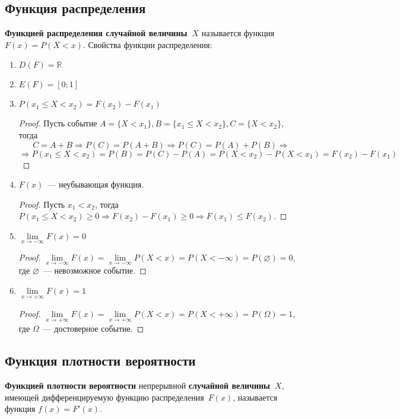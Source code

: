 \subsection{Функция распределения}
 \textbf{Функцией распределения случайной величины~$X$} называется функция $F(x) = P(X < x)$.
Свойства функции распределения:
\begin{enumerate}
	\item $D(F) = \mathbb R$
	
	\item $E(F) = [0; 1]$
	
	\item $P(x_1 \leqslant X < x_2) = F(x_2) - F(x_1)$
	\begin{proof}
	Пусть событие $A = \{ X < x_1 \}, B = \{ x_1 \leqslant X < x_2 \}, C = \{ X < x_2 \}$, тогда
	\begin{equation*}
	C = A + B \Rightarrow
	P(C) = P(A + B) \Rightarrow
	P(C) = P(A) + P(B) \Rightarrow
	\end{equation*}
	\begin{equation*}
	\Rightarrow P(x_1 \leqslant X < x_2) =
	P(B) =
	P(C) - P(A) =
	P(X < x_2) - P(X < x_1) =
	F(x_2) - F(x_1)
	\end{equation*}
	\end{proof}
	
	\item $F(x)$~--- неубывающая функция.
	\begin{proof}
	Пусть $x_1 < x_2$, тогда
	$P(x_1 \leqslant X < x_2) \geqslant 0 \Rightarrow
	F(x_2) - F(x_1) \geqslant 0 \Rightarrow
	F(x_1) \leqslant F(x_2)$.
	\end{proof}
	
	\item $\lim\limits_{x \to -\infty} F(x) = 0$
	\begin{proof}
	$\lim\limits_{x \to -\infty} F(x) =
	\lim\limits_{x \to -\infty} P(X < x) =
	P(X < -\infty) =
	P(\varnothing) =
	0$, где $\varnothing$~--- невозможное событие.
	\end{proof}
	
	\item $\lim\limits_{x \to +\infty} F(x) = 1$
	\begin{proof}
	$\lim\limits_{x \to +\infty} F(x) =
	\lim\limits_{x \to +\infty} P(X < x) =
	P(X < +\infty) =
	P(\Omega) =
	1$, где $\Omega$~--- достоверное событие.
	\end{proof}
\end{enumerate}

\subsection{Функция плотности вероятности}
 \textbf{Функцией плотности вероятности} непрерывной \textbf{случайной величины~$X$}, имеющей дифференцируемую функцию распределения~$F(x)$, называется функция $f(x) = F'(x)$.


